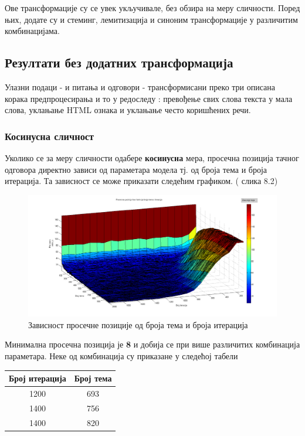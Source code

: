 Ове трансформације су се увек укључивале, без обзира на  меру сличности. Поред њих, додате су и стеминг, лемитизација и синоним трансформације у различитим комбинацијама. 


\subsection{Резултати без додатних трансформација}

Улазни подаци - и питања и одговори - трансформисани преко три описана корака предпроцесирања и то у редоследу :  превођење свих слова текста у мала слова, уклањање HTML ознака и уклањање често коришћених речи.

	\subsubsection{Косинусна сличност}
Уколико се за меру сличности одабере \textbf{косинусна} мера, просечна позиција тачног одговора директно зависи од параметара модела тј. од броја тема и броја итерација. Та зависност се може приказати следећим графиком. ( слика 8.2)
		\begin{figure}[H]
    \centering
   \includegraphics[scale=0.3]{./Slike/noStemNoSyn.png} 
	\caption{Зависност просечне позиције од броја тема и броја итерација}
	\label{fig:slika1}
\end{figure}

Минимална просечна позиција је \textbf{8} и добија се при више различитих комбинација параметара. Неке од комбинација су приказане у следећој табели

\begin{center}
\begin{tabular}{|c|c|}
\hline
Број итерација & Број тема \\
\hline\hline
1200 & 693 \\
1400 & 756 \\
1400 & 820 \\
\hline
\end{tabular}

\end{center}

